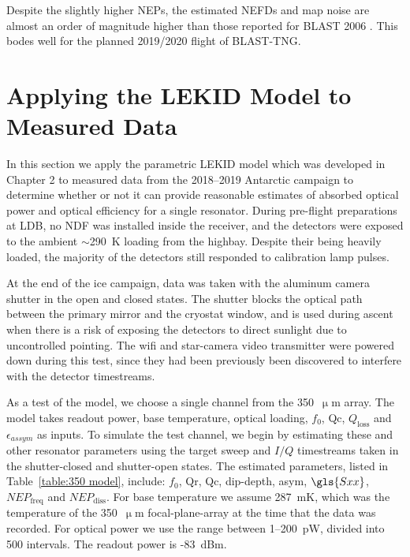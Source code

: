 Despite the slightly higher NEPs, the estimated NEFDs and map noise are almost an order of magnitude higher than those reported for BLAST 2006 \citep{marsden2009blast}. This bodes well for the planned 2019/2020 flight of BLAST-TNG.

\section{Applying the LEKID Model to Measured Data}\label{applying model}

In this section we apply the parametric LEKID model which was developed in Chapter 2 to measured data from the 2018--2019 Antarctic campaign to determine whether or not it can provide reasonable estimates of absorbed optical power and optical efficiency for a single resonator. During pre-flight preparations at LDB, no NDF was installed inside the receiver, and the detectors were exposed to the ambient $\sim$290~K loading from the highbay. Despite their being heavily loaded, the majority of the detectors still responded to calibration lamp pulses.

At the end of the ice campaign, data was taken with the aluminum camera shutter in the open and closed states. The shutter blocks the optical path between the primary mirror and the cryostat window, and is used during ascent when there is a risk of exposing the detectors to direct sunlight due to uncontrolled pointing. The wifi and star-camera video transmitter were powered down during this test, since they had been previously been discovered to interfere with the detector timestreams.

As a test of the model, we choose a single channel from the 350~$\upmu$m array. The model takes readout power, base temperature, optical loading, $f_{0}$, \gls{Qc}, $Q_{\mathrm{loss}}$ and $\epsilon_{assym}$ as inputs. To simulate the test channel, we begin by estimating these and other resonator parameters using the target sweep and $I/Q$ timestreams taken in the shutter-closed and shutter-open states. The estimated parameters, listed in Table~\ref{table:350 model}, include: $f_{0}$, \gls{Qr}, \gls{Qc}, dip-depth, \gls{asym}, $\gls{Sxx}$, $NEP_{\mathrm{freq}}$ and $NEP_{\mathrm{diss}}$. For base temperature we assume 287~mK, which was the temperature of the 350~$\upmu$m focal-plane-array at the time that the data was recorded. For optical power we use the range between 1--200~pW, divided into 500 intervals. The readout power is -83~dBm.

